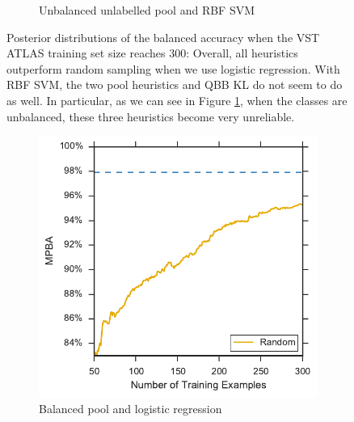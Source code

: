 \begin{figure}[p]
\begin{subfigure}{\textwidth}
		\caption{Unbalanced unlabelled pool and RBF SVM}
		\label{fig:vstatlas_ur_ind_violin}
	\end{subfigure}
	\caption[Violin plots of balanced accuracy (VST ATLAS)]{
		Posterior distributions of the balanced accuracy when the VST ATLAS training set size reaches 300: Overall, all heuristics outperform random sampling when we use logistic regression. With RBF SVM, the two pool heuristics and QBB KL do not seem to do as well.
		In particular, as we can see in Figure \ref{fig:vstatlas_ur_ind_violin}, when the classes are unbalanced, these three heuristics become very unreliable.}
	\label{fig:vstatlas_bl_ind}
\end{figure}


\begin{figure}[p]
	\centering
	\begin{subfigure}{.5\textwidth}
		\centering
		\includegraphics[width=\textwidth]{figures/5_active/vstatlas_bl_ind_lower}
		\caption{Balanced pool and logistic regression}
		\label{fig:vstatlas_bl_ind_lower}
	\end{subfigure}%
	\begin{subfigure}{.5\textwidth}
		\centering

\end{subfigure}
\end{figure}

